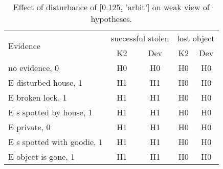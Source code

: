 \begin{table}\begin{tabular}{l|cc|cc}\toprule\multirow{2}{*}{Evidence} & \multicolumn{2}{c}{successful stolen}& \multicolumn{2}{c}{lost object}\\& {K2} & {Dev}& {K2} & {Dev}\\\midrule
no evidence, 0 & H0&H0&H0&H0\\E disturbed house, 1 & H1&H1&H0&H0\\E broken lock, 1 & H1&H1&H0&H0\\E s spotted by house, 1 & H1&H1&H0&H0\\E private, 0 & H1&H1&H0&H0\\E s spotted with goodie, 1 & H1&H1&H0&H0\\E object is gone, 1 & H1&H1&H0&H0\\\bottomrule\end{tabular}\caption{Effect of disturbance of [0.125, 'arbit'] on weak view of hypotheses.}\end{table}